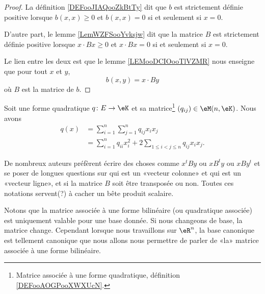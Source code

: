 \begin{proof}
    La définition \ref{DEFooJIAQooZkBtTy} dit que \( b\) est strictement définie positive lorsque \( b(x,x)\geq 0\) et \( b(x,x)=0\) si et seulement si \( x=0\).

    D'autre part, le lemme \ref{LemWZFSooYvksjw} dit que la matrice \( B\) est strictement définie positive lorsque \( x\cdot Bx\geq 0\) et \( x\cdot Bx=0\) si et seulement si \( x=0\).

    Le lien entre les deux est que le lemme \ref{LEMooDCIOooTlVZMR} nous enseigne que pour tout \( x\) et \( y\),
    \begin{equation}
        b(x,y)=x\cdot By
    \end{equation}
    où \( B\) est la matrice de \( b\).
\end{proof}

\begin{proposition}     \label{PROPooCIEUooODqfwm}
    Soit une forme quadratique \( q\colon E\to \eK\) et sa matrice\footnote{Matrice associée à une forme quadratique, définition \ref{DEFooAOGPooXWXUcN}.} \( (q_{ij})\in \eM(n,\eK)\). Nous avons
    \begin{subequations}        \label{SUBEQSooEHVXooJjKLqyiB}
        \begin{align}
            q(x)&=\sum_{i=1}^n\sum_{j=1}^nq_{ij}x_ix_j\\
            &=\sum_{i=1}^nq_{ii}x_i^2+2\sum_{1\leq i <j\leq n}q_{ij}x_ix_j.
        \end{align}
    \end{subequations}
\end{proposition}

\begin{normaltext}
    De nombreux auteurs préfèrent écrire des choses comme \( x^tBy\) ou \( xB^ty\) ou \( xBy^t\) et se poser de longues questions sur qui est un «vecteur colonne» et qui est un «vecteur ligne», et si la matrice \( B\) soit être transposée ou non. Toutes ces notations servent(?) à cacher un bête produit scalaire.
\end{normaltext}

\begin{normaltext}
    Notons que la matrice associée à une forme bilinéaire (ou quadratique associée) est uniquement valable pour une base donnée. Si nous changeons de base, la matrice change. Cependant lorsque nous travaillons sur \( \eR^n\), la base canonique est tellement canonique que nous allons nous permettre de parler de «la» matrice associée à une forme bilinéaire.
\end{normaltext}

